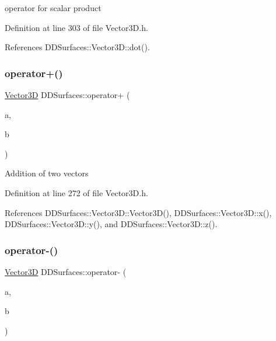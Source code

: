 operator for scalar product 



Definition at line 303 of file Vector3\+D.\+h.



References D\+D\+Surfaces\+::\+Vector3\+D\+::dot().

\hypertarget{namespace_d_d_surfaces_a53190f14a4492924eba5f73fe10b7c2e}{}\label{namespace_d_d_surfaces_a53190f14a4492924eba5f73fe10b7c2e} 
\subsubsection{\texorpdfstring{operator+()}{operator+()}}
{\footnotesize\ttfamily \hyperlink{class_d_d_surfaces_1_1_vector3_d}{Vector3D} D\+D\+Surfaces\+::operator+ (\begin{DoxyParamCaption}\item[{const \hyperlink{class_d_d_surfaces_1_1_vector3_d}{Vector3D} \&}]{a,  }\item[{const \hyperlink{class_d_d_surfaces_1_1_vector3_d}{Vector3D} \&}]{b }\end{DoxyParamCaption})\hspace{0.3cm}{\ttfamily [inline]}}

Addition of two vectors 

Definition at line 272 of file Vector3\+D.\+h.



References D\+D\+Surfaces\+::\+Vector3\+D\+::\+Vector3\+D(), D\+D\+Surfaces\+::\+Vector3\+D\+::x(), D\+D\+Surfaces\+::\+Vector3\+D\+::y(), and D\+D\+Surfaces\+::\+Vector3\+D\+::z().

\hypertarget{namespace_d_d_surfaces_a99285e6f4b3e9bbe41a5ce357ed5f4ce}{}\label{namespace_d_d_surfaces_a99285e6f4b3e9bbe41a5ce357ed5f4ce} 
\subsubsection{\texorpdfstring{operator-\/()}{operator-()}\hspace{0.1cm}{\footnotesize\ttfamily [1/2]}}
{\footnotesize\ttfamily \hyperlink{class_d_d_surfaces_1_1_vector3_d}{Vector3D} D\+D\+Surfaces\+::operator-\/ (\begin{DoxyParamCaption}\item[{const \hyperlink{class_d_d_surfaces_1_1_vector3_d}{Vector3D} \&}]{a,  }\item[{const \hyperlink{class_d_d_surfaces_1_1_vector3_d}{Vector3D} \&}]{b }\end{DoxyParamCaption})\hspace{0.3cm}{\ttfamily [inline]}}

